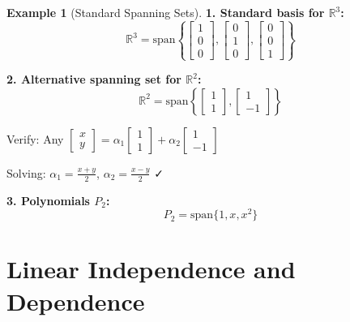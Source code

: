 \documentclass[12pt,a4paper]{article}
\theoremstyle{definition}
\newtheorem{example}{Example}[section]
\begin{document}
\begin{example}[Standard Spanning Sets]
\textbf{1. Standard basis for $\mathbb{R}^3$:}
\begin{equation}
\mathbb{R}^3 = \text{span}\left\{\begin{bmatrix} 1 \\ 0 \\ 0 \end{bmatrix}, \begin{bmatrix} 0 \\ 1 \\ 0 \end{bmatrix}, \begin{bmatrix} 0 \\ 0 \\ 1 \end{bmatrix}\right\}
\end{equation}

\textbf{2. Alternative spanning set for $\mathbb{R}^2$:}
\begin{equation}
\mathbb{R}^2 = \text{span}\left\{\begin{bmatrix} 1 \\ 1 \end{bmatrix}, \begin{bmatrix} 1 \\ -1 \end{bmatrix}\right\}
\end{equation}

Verify: Any $\begin{bmatrix} x \\ y \end{bmatrix} = \alpha_1\begin{bmatrix} 1 \\ 1 \end{bmatrix} + \alpha_2\begin{bmatrix} 1 \\ -1 \end{bmatrix}$

Solving: $\alpha_1 = \frac{x+y}{2}$, $\alpha_2 = \frac{x-y}{2}$ ✓

\textbf{3. Polynomials $P_2$:}
\begin{equation}
P_2 = \text{span}\{1, x, x^2\}
\end{equation}
\end{example}

\section{Linear Independence and Dependence}
\end{document}
